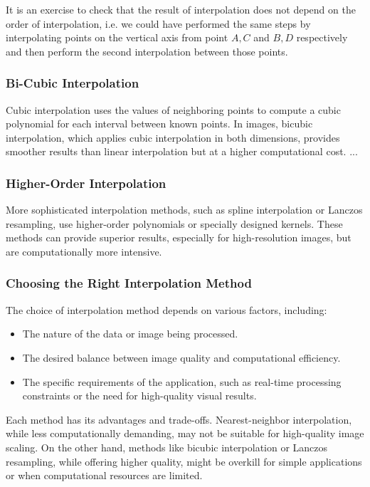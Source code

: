 \documentclass[11pt]{book}
\begin{document}
It is an exercise to check that the result of interpolation does not depend on the order of interpolation, i.e. we could have performed the same steps by interpolating points on the vertical axis from point $A,C$ and $B,D$ respectively and then perform the second interpolation between those points. 


\subsubsection{Bi-Cubic Interpolation}
Cubic interpolation uses the values of neighboring points to compute a cubic polynomial for each interval between known points. In images, bicubic interpolation, which applies cubic interpolation in both dimensions, provides smoother results than linear interpolation but at a higher computational cost.
...

\subsubsection{Higher-Order Interpolation}
More sophisticated interpolation methods, such as spline interpolation or Lanczos resampling, use higher-order polynomials or specially designed kernels. These methods can provide superior results, especially for high-resolution images, but are computationally more intensive.



\subsubsection{Choosing the Right Interpolation Method}
The choice of interpolation method depends on various factors, including:
\begin{itemize}
    \item The nature of the data or image being processed.
    \item The desired balance between image quality and computational efficiency.
    \item The specific requirements of the application, such as real-time processing constraints or the need for high-quality visual results.
\end{itemize}

Each method has its advantages and trade-offs. Nearest-neighbor interpolation, while less computationally demanding, may not be suitable for high-quality image scaling. On the other hand, methods like bicubic interpolation or Lanczos resampling, while offering higher quality, might be overkill for simple applications or when computational resources are limited.
\end{document}
